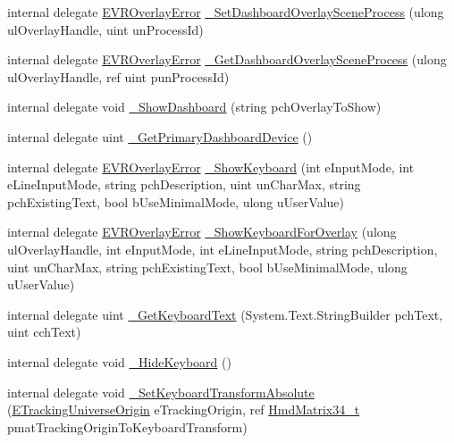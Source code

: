 \begin{DoxyCompactItemize}
\item 
internal delegate \mbox{\hyperlink{namespace_valve_1_1_v_r_aaee5c5144f42b7969d45b854f51b0c18}{E\+V\+R\+Overlay\+Error}} \mbox{\hyperlink{struct_valve_1_1_v_r_1_1_i_v_r_overlay_ad5f215941b5872353dd95bf1b24fad09}{\+\_\+\+Set\+Dashboard\+Overlay\+Scene\+Process}} (ulong ul\+Overlay\+Handle, uint un\+Process\+Id)
\item 
internal delegate \mbox{\hyperlink{namespace_valve_1_1_v_r_aaee5c5144f42b7969d45b854f51b0c18}{E\+V\+R\+Overlay\+Error}} \mbox{\hyperlink{struct_valve_1_1_v_r_1_1_i_v_r_overlay_ac3f0a30c6da88a835a1649b4eee9f314}{\+\_\+\+Get\+Dashboard\+Overlay\+Scene\+Process}} (ulong ul\+Overlay\+Handle, ref uint pun\+Process\+Id)
\item 
internal delegate void \mbox{\hyperlink{struct_valve_1_1_v_r_1_1_i_v_r_overlay_ab4a713cf43946bbc014316ba20c21a3e}{\+\_\+\+Show\+Dashboard}} (string pch\+Overlay\+To\+Show)
\item 
internal delegate uint \mbox{\hyperlink{struct_valve_1_1_v_r_1_1_i_v_r_overlay_ad8a44528c5a3aefe931435586391a25c}{\+\_\+\+Get\+Primary\+Dashboard\+Device}} ()
\item 
internal delegate \mbox{\hyperlink{namespace_valve_1_1_v_r_aaee5c5144f42b7969d45b854f51b0c18}{E\+V\+R\+Overlay\+Error}} \mbox{\hyperlink{struct_valve_1_1_v_r_1_1_i_v_r_overlay_a3f0da6da79c2932b9619f74f119f24f5}{\+\_\+\+Show\+Keyboard}} (int e\+Input\+Mode, int e\+Line\+Input\+Mode, string pch\+Description, uint un\+Char\+Max, string pch\+Existing\+Text, bool b\+Use\+Minimal\+Mode, ulong u\+User\+Value)
\item 
internal delegate \mbox{\hyperlink{namespace_valve_1_1_v_r_aaee5c5144f42b7969d45b854f51b0c18}{E\+V\+R\+Overlay\+Error}} \mbox{\hyperlink{struct_valve_1_1_v_r_1_1_i_v_r_overlay_ad13a58d49b69b35ac76962579290372f}{\+\_\+\+Show\+Keyboard\+For\+Overlay}} (ulong ul\+Overlay\+Handle, int e\+Input\+Mode, int e\+Line\+Input\+Mode, string pch\+Description, uint un\+Char\+Max, string pch\+Existing\+Text, bool b\+Use\+Minimal\+Mode, ulong u\+User\+Value)
\item 
internal delegate uint \mbox{\hyperlink{struct_valve_1_1_v_r_1_1_i_v_r_overlay_a6c94397fef04c6bac6f7865bb92ed82a}{\+\_\+\+Get\+Keyboard\+Text}} (System.\+Text.\+String\+Builder pch\+Text, uint cch\+Text)
\item 
internal delegate void \mbox{\hyperlink{struct_valve_1_1_v_r_1_1_i_v_r_overlay_acd7a1c9668b31dc428bd90a91d841841}{\+\_\+\+Hide\+Keyboard}} ()
\item 
internal delegate void \mbox{\hyperlink{struct_valve_1_1_v_r_1_1_i_v_r_overlay_a972e7074df2f3719f9df1233d0d4bab9}{\+\_\+\+Set\+Keyboard\+Transform\+Absolute}} (\mbox{\hyperlink{namespace_valve_1_1_v_r_a29be99a3c2f780157bd490db06a7f12f}{E\+Tracking\+Universe\+Origin}} e\+Tracking\+Origin, ref \mbox{\hyperlink{struct_valve_1_1_v_r_1_1_hmd_matrix34__t}{Hmd\+Matrix34\+\_\+t}} pmat\+Tracking\+Origin\+To\+Keyboard\+Transform)

\end{DoxyCompactItemize}
